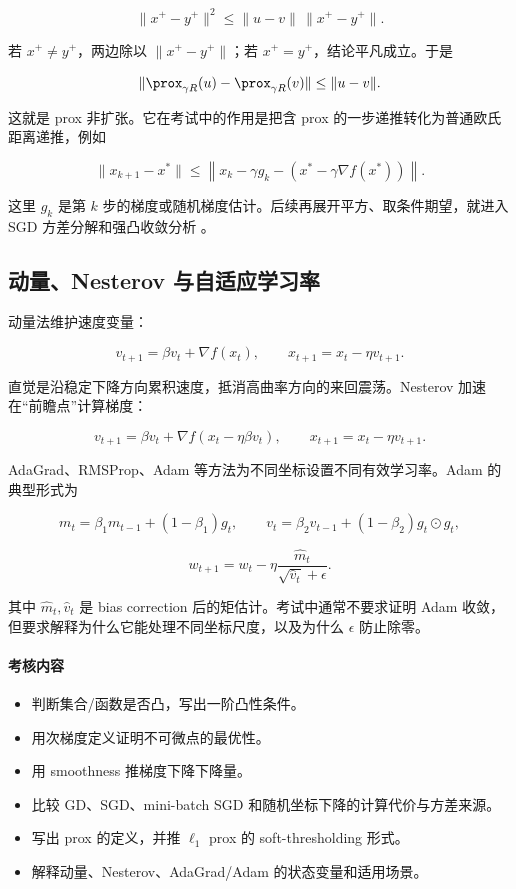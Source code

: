 \[
  \|x^+-y^+\|^2
  \le
  \|u-v\|\,\|x^+-y^+\|.
\]

若 \(x^+\ne y^+\)，两边除以 \(\|x^+-y^+\|\)；若 \(x^+=y^+\)，结论平凡成立。于是

\[
  \|\prox_{\gamma R}(u)-\prox_{\gamma R}(v)\|
  \le
  \|u-v\|.
\]

这就是 prox 非扩张。它在考试中的作用是把含 prox 的一步递推转化为普通欧氏距离递推，例如

\[
  \|x_{k+1}-x^*\|
  \le
  \left\|
    x_k-\gamma g_k
    -
    \left(x^*-\gamma\nabla f(x^*)\right)
  \right\|.
\]

这里 \(g_k\) 是第 \(k\) 步的梯度或随机梯度估计。后续再展开平方、取条件期望，就进入 SGD 方差分解和强凸收敛分析 \parencite{beck2017first,nesterov2018convex}。

\subsection{动量、Nesterov 与自适应学习率}

动量法维护速度变量：

\[
  v_{t+1}=\beta v_t+\nabla f(x_t),
  \qquad
  x_{t+1}=x_t-\eta v_{t+1}.
\]

直觉是沿稳定下降方向累积速度，抵消高曲率方向的来回震荡。Nesterov 加速在“前瞻点”计算梯度：

\[
  v_{t+1}
  =
  \beta v_t+\nabla f(x_t-\eta\beta v_t),
  \qquad
  x_{t+1}=x_t-\eta v_{t+1}.
\]

AdaGrad、RMSProp、Adam 等方法为不同坐标设置不同有效学习率。Adam 的典型形式为

\[
  m_t=\beta_1m_{t-1}+(1-\beta_1)g_t,
  \qquad
  v_t=\beta_2v_{t-1}+(1-\beta_2)g_t\odot g_t,
\]

\[
  w_{t+1}
  =
  w_t
  -
  \eta
  \frac{\widehat m_t}{\sqrt{\widehat v_t}+\epsilon}.
\]

其中 \(\widehat m_t,\widehat v_t\) 是 bias correction 后的矩估计。考试中通常不要求证明 Adam 收敛，但要求解释为什么它能处理不同坐标尺度，以及为什么 \(\epsilon\) 防止除零。

\paragraph{考核内容}

\begin{itemize}
  \item 判断集合/函数是否凸，写出一阶凸性条件。
  \item 用次梯度定义证明不可微点的最优性。
  \item 用 smoothness 推梯度下降下降量。
  \item 比较 GD、SGD、mini-batch SGD 和随机坐标下降的计算代价与方差来源。
  \item 写出 prox 的定义，并推 \(\ell_1\) prox 的 soft-thresholding 形式。
  \item 解释动量、Nesterov、AdaGrad/Adam 的状态变量和适用场景。
\end{itemize}

